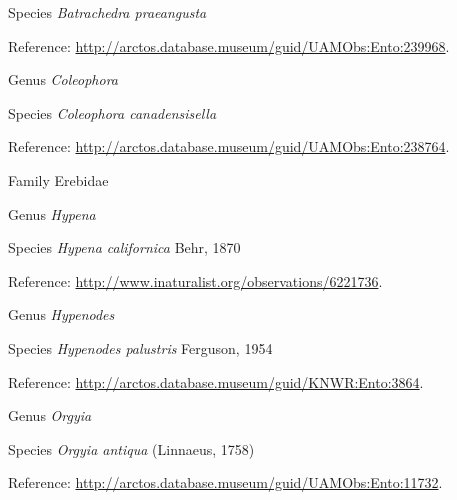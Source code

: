 \documentclass[9pt, article]{memoir}
\begin{document}
\begin{multicols}{2}
\vspace{6pt}\noindent\hspace{36pt}Species \textit{Batrachedra praeangusta}


\vspace{6pt}Reference: 
\url{http://arctos.database.museum/guid/UAMObs:Ento:239968}.

\vspace{6pt}\noindent\hspace{30pt}Genus \textit{Coleophora}


\vspace{6pt}\noindent\hspace{36pt}Species \textit{Coleophora canadensisella}


\vspace{6pt}Reference: 
\url{http://arctos.database.museum/guid/UAMObs:Ento:238764}.

\vspace{6pt}\noindent\hspace{24pt}Family Erebidae


\vspace{6pt}\noindent\hspace{30pt}Genus \textit{Hypena}


\vspace{6pt}\noindent\hspace{36pt}Species \textit{Hypena californica} Behr, 1870


\vspace{6pt}Reference: 
\url{http://www.inaturalist.org/observations/6221736}.

\vspace{6pt}\noindent\hspace{30pt}Genus \textit{Hypenodes}


\vspace{6pt}\noindent\hspace{36pt}Species \textit{Hypenodes palustris} Ferguson, 1954


\vspace{6pt}Reference: 
\url{http://arctos.database.museum/guid/KNWR:Ento:3864}.

\vspace{6pt}\noindent\hspace{30pt}Genus \textit{Orgyia}


\vspace{6pt}\noindent\hspace{36pt}Species \textit{Orgyia antiqua} (Linnaeus, 1758)


\vspace{6pt}Reference: 
\url{http://arctos.database.museum/guid/UAMObs:Ento:11732}.


\end{multicols}
\end{document}
